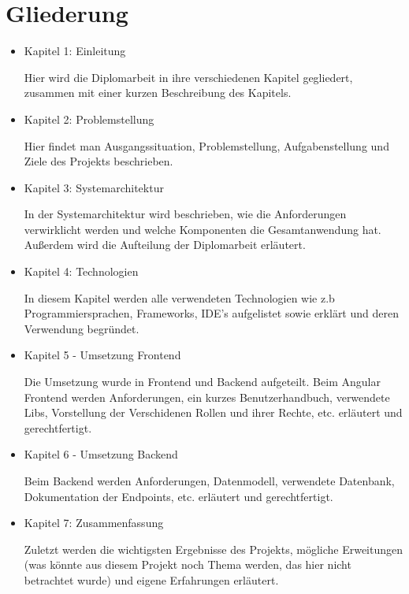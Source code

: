 \section{Gliederung}

\begin{itemize}
    \item  Kapitel 1: Einleitung
    
    Hier wird die Diplomarbeit in ihre verschiedenen Kapitel gegliedert, zusammen mit einer kurzen Beschreibung des Kapitels.
    
    \item  Kapitel 2: Problemstellung
    
    Hier findet man Ausgangssituation, Problemstellung, Aufgabenstellung und Ziele des Projekts beschrieben.
    
    \item  Kapitel 3: Systemarchitektur
    
    In der Systemarchitektur wird beschrieben, wie die Anforderungen verwirklicht werden und welche Komponenten die Gesamtanwendung hat. 
    Außerdem wird die Aufteilung der Diplomarbeit erläutert.

    \item  Kapitel 4: Technologien
    
    In diesem Kapitel werden alle verwendeten Technologien wie z.b Programmiersprachen, Frameworks, IDE's aufgelistet sowie erklärt und deren Verwendung begründet.

    \item  Kapitel 5 - Umsetzung Frontend
    
    Die Umsetzung wurde in Frontend und Backend aufgeteilt. Beim Angular Frontend werden Anforderungen, ein kurzes Benutzerhandbuch, verwendete Libs, Vorstellung der Verschidenen Rollen und ihrer Rechte, etc. erläutert und gerechtfertigt.
    
    \item  Kapitel 6 - Umsetzung Backend
    
    Beim Backend werden Anforderungen, Datenmodell, verwendete Datenbank, Dokumentation der Endpoints, etc. erläutert und gerechtfertigt.
    
    \item  Kapitel 7: Zusammenfassung
    
    Zuletzt werden die wichtigsten Ergebnisse des Projekts, mögliche Erweitungen (was könnte aus diesem Projekt noch Thema werden, 
    das hier nicht betrachtet wurde) und eigene Erfahrungen erläutert.
\end{itemize}